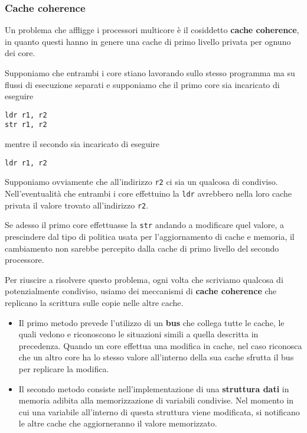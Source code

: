 \subsubsection{Cache coherence}
Un problema che affligge i processori multicore è il cosiddetto \textbf{cache coherence}, in quanto
questi hanno in genere una cache di primo livello privata per ognuno dei core.
\begin{center}
	
\end{center}
Supponiamo che entrambi i core stiano lavorando sullo stesso programma ma su flussi di esecuzione
separati e supponiamo che il primo core sia incaricato di eseguire
\begin{verbatim}
ldr r1, r2
str r1, r2
\end{verbatim}
mentre il secondo sia incaricato di eseguire
\begin{verbatim}
ldr r1, r2
\end{verbatim}
Supponiamo ovviamente che all'indirizzo \verb|r2| ci sia un qualcosa di condiviso. Nell'eventualità
che entrambi i core effettuino la \verb|ldr| avrebbero nella loro cache privata il valore trovato
all'indirizzo \verb|r2|.

Se adesso il primo core effettuasse la \verb|str| andando a modificare quel valore, a prescindere
dal tipo di politica usata per l'aggiornamento di cache e memoria, il cambiamento non sarebbe
percepito dalla cache di primo livello del secondo processore.

Per riuscire a risolvere questo problema, ogni volta che scriviamo qualcosa di potenzialmente
condiviso, usiamo dei meccanismi di \textbf{cache coherence} che replicano la scrittura sulle copie
nelle altre cache.
\begin{itemize}
	\item Il primo metodo prevede l'utilizzo di un \textbf{bus} che collega tutte le cache, le
	      quali vedono e riconoscono le situazioni simili a quella descritta in precedenza. Quando
	      un core effettua una modifica in cache, nel caso riconosca che un altro core ha lo stesso
	      valore all'interno della sua cache sfrutta il bus per replicare la modifica.
	\item Il secondo metodo consiste nell'implementazione di una \textbf{struttura dati} in memoria
	      adibita alla memorizzazione di variabili condivise. Nel momento in cui una variabile
	      all'interno di questa struttura viene modificata, si notificano le altre cache che
	      aggiorneranno il valore memorizzato.
\end{itemize}
